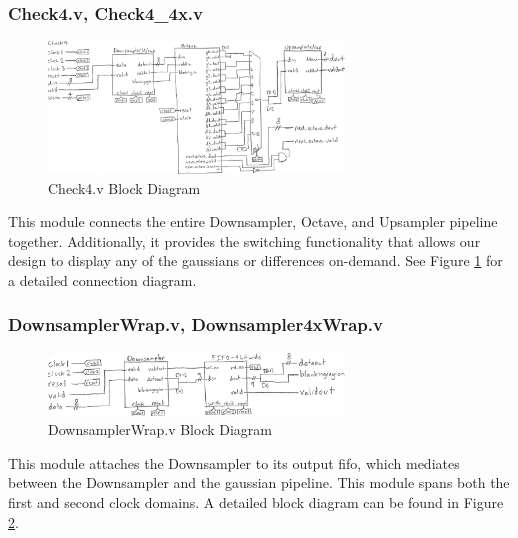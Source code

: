 \documentclass[12pt]{article}
\begin{document}
\subsubsection{Check4.v, Check4\_4x.v}

\begin{figure}
    \centering
    \includegraphics[width=0.7\textwidth]{processed_image_pngs/Check4.png}
    \caption{Check4.v Block Diagram}
    \label{fig:check_4}
\end{figure}


This module connects the entire Downsampler, Octave, and Upsampler pipeline together.
Additionally, it provides the switching functionality that allows our design to 
display any of the gaussians or differences on-demand. See Figure \ref{fig:check_4} for 
a detailed connection diagram.

\subsubsection{DownsamplerWrap.v, Downsampler4xWrap.v}


\begin{figure}
    \centering
    \includegraphics[width=0.7\textwidth]{processed_image_pngs/DownsamplerWrap.png}
    \caption{DownsamplerWrap.v Block Diagram}
    \label{fig:down_wrap}
\end{figure}


This module attaches the Downsampler to its output fifo, which mediates between
the Downsampler and the gaussian pipeline. This module spans both the first
and second clock domains. A detailed block diagram can be found in Figure \ref{fig:down_wrap}.
\end{document}
